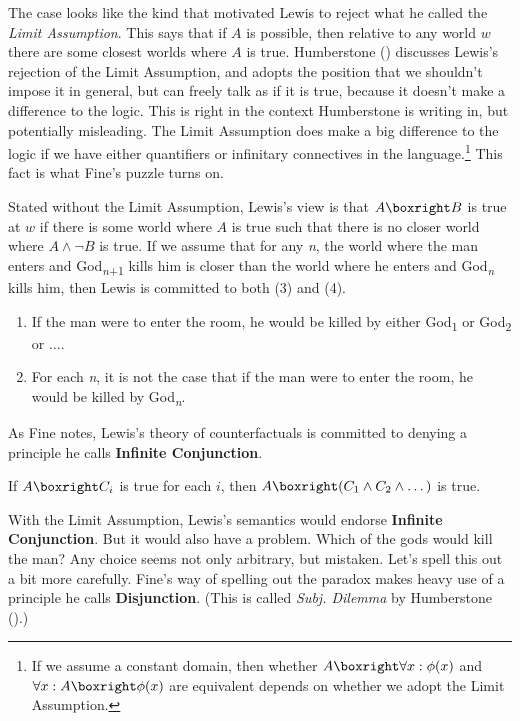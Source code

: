 \documentclass[
  11pt,
  letterpaper,
  DIV=11,
  numbers=noendperiod,
  twoside]{scrartcl}
\providecommand{\tightlist}{%
  \setlength{\itemsep}{0pt}\setlength{\parskip}{0pt}}
\begin{document}
The case looks like the kind that motivated Lewis to reject what he
called the \emph{Limit Assumption}. This says that if \(A\) is possible,
then relative to any world \(w\) there are some closest worlds where
\(A\) is true. Humberstone () discusses Lewis's rejection of the Limit Assumption, and
adopts the position that we shouldn't impose it in general, but can
freely talk as if it is true, because it doesn't make a difference to
the logic. This is right in the context Humberstone is writing in, but
potentially misleading. The Limit Assumption does make a big difference
to the logic if we have either quantifiers or infinitary connectives in
the language.\footnote{If we assume a constant domain, then whether
  \(A \boxright \forall x: \phi(x)\) and
  \(\forall x: A \boxright \phi(x)\) are equivalent depends on whether
  we adopt the Limit Assumption.} This fact is what Fine's puzzle turns
on.

Stated without the Limit Assumption, Lewis's view is that
\(A \boxright B\) is true at \(w\) if there is some world where \(A\) is
true such that there is no closer world where \(A \wedge \neg B\) is
true. If we assume that for any \emph{n}, the world where the man enters
and God\textsubscript{\emph{n}+1} kills him is closer than the world
where he enters and God\textsubscript{\emph{n}} kills him, then Lewis is
committed to both (3) and (4).

\begin{enumerate}
\def\labelenumi{(\arabic{enumi})}
\setcounter{enumi}{2}
\tightlist
\item
  If the man were to enter the room, he would be killed by either
  God\textsubscript{1} or God\textsubscript{2} or \(\dots\).
\item
  For each \emph{n}, it is not the case that if the man were to enter
  the room, he would be killed by God\textsubscript{\emph{n}}.
\end{enumerate}

As Fine notes, Lewis's theory of counterfactuals is committed to denying
a principle he calls \textbf{Infinite Conjunction}.

\begin{description}
\tightlist
\item[Infinite Conjunction]
If \(A \boxright C_i\) is true for each \(i\), then
\(A \boxright (C_1 \wedge C_2 \wedge \dots)\) is true.
\end{description}

With the Limit Assumption, Lewis's semantics would endorse
\textbf{Infinite Conjunction}. But it would also have a problem. Which
of the gods would kill the man? Any choice seems not only arbitrary, but
mistaken. Let's spell this out a bit more carefully. Fine's way of
spelling out the paradox makes heavy use of a principle he calls
\textbf{Disjunction}. (This is called \emph{Subj. Dilemma} by
Humberstone ().)
\end{document}
